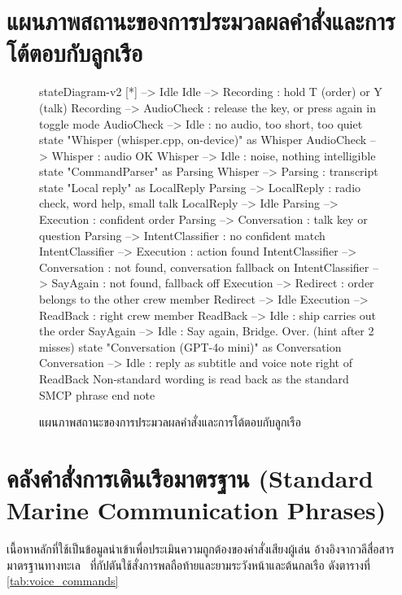\section*{แผนภาพสถานะของการประมวลผลคำสั่งและการโต้ตอบกับลูกเรือ}


\begin{figure}[H]
\centering
\begin{mermaid}
stateDiagram-v2
    [*] --> Idle
    Idle --> Recording : hold T (order) or Y (talk)
    Recording --> AudioCheck : release the key, or press again in toggle mode
    AudioCheck --> Idle : no audio, too short, too quiet
    state "Whisper (whisper.cpp, on-device)" as Whisper
    AudioCheck --> Whisper : audio OK
    Whisper --> Idle : noise, nothing intelligible
    state "CommandParser" as Parsing
    Whisper --> Parsing : transcript
    state "Local reply" as LocalReply
    Parsing --> LocalReply : radio check, word help, small talk
    LocalReply --> Idle
    Parsing --> Execution : confident order
    Parsing --> Conversation : talk key or question
    Parsing --> IntentClassifier : no confident match
    IntentClassifier --> Execution : action found
    IntentClassifier --> Conversation : not found, conversation fallback on
    IntentClassifier --> SayAgain : not found, fallback off
    Execution --> Redirect : order belongs to the other crew member
    Redirect --> Idle
    Execution --> ReadBack : right crew member
    ReadBack --> Idle : ship carries out the order
    SayAgain --> Idle : Say again, Bridge. Over. (hint after 2 misses)
    state "Conversation (GPT-4o mini)" as Conversation
    Conversation --> Idle : reply as subtitle and voice
    note right of ReadBack
        Non-standard wording is read back
        as the standard SMCP phrase
    end note
\end{mermaid}
\caption{แผนภาพสถานะของการประมวลผลคำสั่งและการโต้ตอบกับลูกเรือ}
\label{fig:state_ai_communication}
\end{figure}


\section*{คลังคำสั่งการเดินเรือมาตรฐาน (Standard Marine Communication Phrases)}


เนื้อหาหลักที่ใช้เป็นข้อมูลนำเข้าเพื่อประเมินความถูกต้องของคำสั่งเสียงผู้เล่น อ้างอิงจากวลีสื่อสารมาตรฐานทางทะเล~\cite{imo2002smcp} ที่กัปตันใช้สั่งการพลถือท้ายและยามระวังหน้าและต้นกลเรือ ดังตารางที่ \ref{tab:voice_commands}

